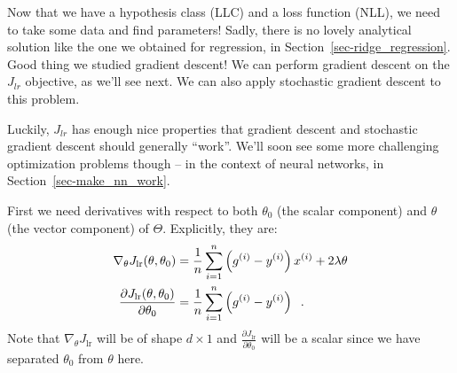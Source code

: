 Now that we have a hypothesis class (LLC) and a loss function (NLL),
we need to take some data and find parameters!
Sadly, there is no lovely analytical solution like the one we obtained
for regression, in Section~\ref{sec-ridge_regression}.  Good thing we
studied gradient descent!  We can perform gradient descent on the
$J_{lr}$ objective, as we'll see next.  We can also apply stochastic
gradient descent to this problem.

Luckily, $J_{lr}$ has enough nice properties that gradient descent and
stochastic gradient descent should generally ``work''. We'll soon see
some more challenging optimization problems though -- in the
context of neural networks, in Section~\ref{sec-make_nn_work}.

First we need derivatives with respect to both $\theta_0$ (the scalar
component) and $\theta$ (the vector component) of $\Theta$.
Explicitly, they are:
\begin{align*}
  \nabla_\theta J_\text{lr}(\theta, \theta_0)                      & =  \frac{1}{n}\sum_{i=1}^n
  \left(g^{(i)} -
  y^{(i)}\right) x^{(i)}
  + 2\lambda\theta                                                                              \\
  \frac{\partial J_\text{lr}(\theta, \theta_0)}{\partial \theta_0} & =
  \frac{1}{n}\sum_{i=1}^n
  \left(g^{(i)} -
  y^{(i)} \right) \;\;.
\end{align*}
Note that $\nabla_\theta J_\text{lr}$ will be of shape $d \times 1$ and
$\frac{\partial J_\text{lr}}{\partial \theta_0}$ will be a scalar since
we have separated $\theta_0$ from $\theta$ here.




